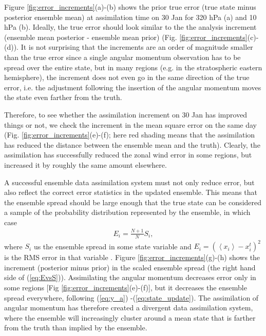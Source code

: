 Figure \ref{fig:error_increments}(a)-(b) shows the prior true error (true state minus posterior ensemble mean) at assimilation time on 30 Jan for 320 hPa (a) and 10 hPa (b).
Ideally, the true error should look similar to the the analysis increment (ensemble mean posterior - ensemble mean prior) (Fig. \ref{fig:error_increments}(c)-(d)).
It is not surprising that the increments are an order of magnitude smaller than the true error 
since a single angular momentum observation has to be spread over the entire state,
but in many regions (e.g. in the stratospheric eastern hemisphere), the increment does not even go in the same direction of the true error, i.e. the adjustment following the insertion of the angular momentum moves the state even farther from the truth. 

Therefore, to see whether the assimilation increment on 30 Jan has improved things or not, we check the increment in the mean square error on the same day (Fig. \ref{fig:error_increments}(e)-(f);
here red shading means that the assimilation has reduced the distance between the ensemble mean and the truth).
Clearly, the assimilation has successfully reduced the zonal wind error in some regions, but increased it by roughly the same amount elsewhere.

A successful ensemble data assimilation system must not only reduce error, 
but also reflect the correct error statistics in the updated ensemble.
This means that the ensemble spread should be large 
enough that the true state can be considered  a sample of the probability 
distribution represented by the ensemble, in which case 
 \begin{eqnarray}
	 E_i = \frac{N+1}{N} S_i, 
	 \label{eq:EvsS}
 \end{eqnarray}
where $S_i$ us the ensemble spread in some state variable and $E_i=\left(\left< x_i \right>-x_{i}^{t}\right)^2$ is the RMS error in that variable \citep{Huntley2009, Murphy1988}.  
Figure \ref{fig:error_increments}(g)-(h) shows the increment (posterior minus prior) in the scaled ensemble spread (the right hand side of (\ref{eq:EvsS})).
Assimilating the angular momentum decreases error only in some regions [Fig \ref{fig:error_increments}(e)-(f)], but it decreases the ensemble spread everywhere, 
following (\ref{eq:y_a}) -(\ref{eq:state_update}).  
The assimilation of angular momentum has therefore created 
a divergent data assimilation system, where the ensemble will increasingly cluster around a mean state that is farther from the truth than implied by the ensemble. 


